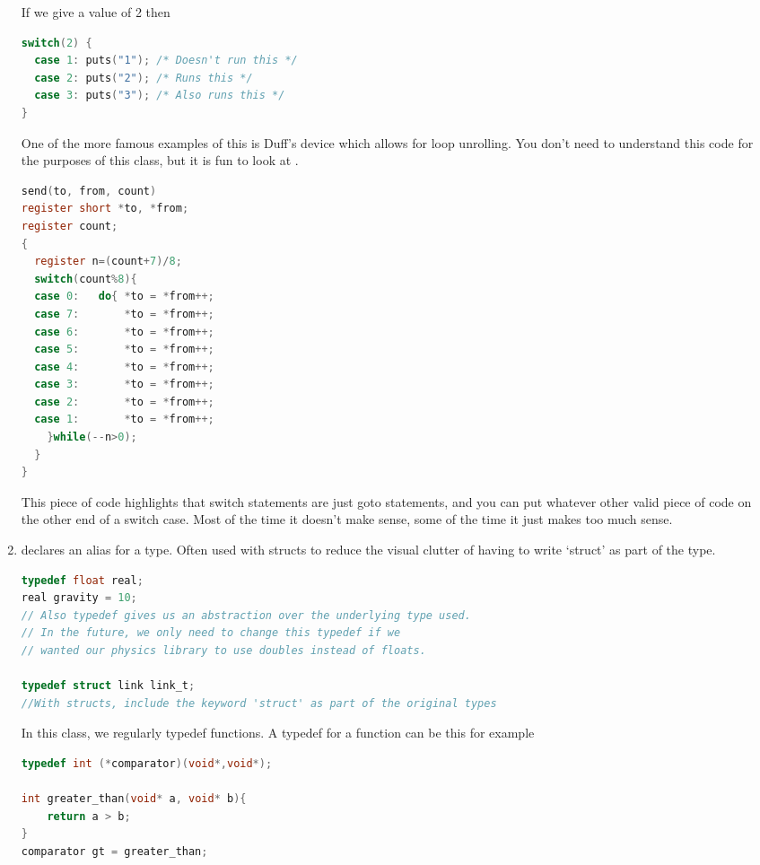 \begin{enumerate}
	      If we give a value of 2 then
	      \\
	      \begin{lstlisting}[language=C]
switch(2) {
  case 1: puts("1"); /* Doesn't run this */
  case 2: puts("2"); /* Runs this */
  case 3: puts("3"); /* Also runs this */
}
\end{lstlisting}

        One of the more famous examples of this is Duff's device which allows for loop unrolling. You don't need to understand this code for the purposes of this class, but it is fun to look at \cite{duff}.

        \begin{lstlisting}[language=C]
send(to, from, count)
register short *to, *from;
register count;
{
  register n=(count+7)/8;
  switch(count%8){
  case 0:	do{	*to = *from++;
  case 7:		*to = *from++;
  case 6:		*to = *from++;
  case 5:		*to = *from++;
  case 4:		*to = *from++;
  case 3:		*to = *from++;
  case 2:		*to = *from++;
  case 1:		*to = *from++;
    }while(--n>0);
  }
}
\end{lstlisting}
        This piece of code highlights that switch statements are just goto statements, and you can put whatever other valid piece of code on the other end of a switch case. Most of the time it doesn't make sense, some of the time it just makes too much sense.

	    \item {} declares an alias for a type.
        Often used with structs to reduce the visual clutter of having to write `struct' as part of the type.

	      \begin{lstlisting}[language=C]
typedef float real;
real gravity = 10;
// Also typedef gives us an abstraction over the underlying type used.
// In the future, we only need to change this typedef if we
// wanted our physics library to use doubles instead of floats.

typedef struct link link_t;
//With structs, include the keyword 'struct' as part of the original types
\end{lstlisting}

	      In this class, we regularly typedef functions.
        A typedef for a function can be this for example

	      \begin{lstlisting}[language=C]
typedef int (*comparator)(void*,void*);

int greater_than(void* a, void* b){
    return a > b;
}
comparator gt = greater_than;
\end{lstlisting}


\end{enumerate}
